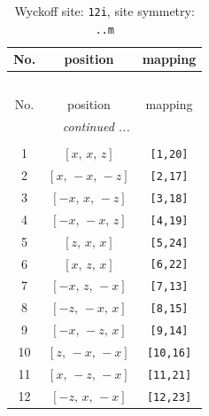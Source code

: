 \documentclass[fleqn,8pt]{jsarticle}
\begin{document}
\begin{longtable}{ccc}
\caption{Wyckoff site: {\tt 12i}, site symmetry: {\tt ..m}}
 \\
 \hline \hline
No. & position & mapping \\ \hline \endfirsthead

\multicolumn{2}{l}{\tablename\ \thetable{}} \\
 \hline \hline
No. & position & mapping \\ \hline \endhead

 \hline \hline
\multicolumn{2}{r}{\footnotesize\it continued ...} \\ \endfoot

 \hline \hline
\multicolumn{2}{r}{} \\ \endlastfoot

1 & $\left[ x,\, x,\, z \right]$ & {\tt [1,20]} \\ \hline
2 & $\left[ x,\, - x,\, - z \right]$ & {\tt [2,17]} \\ \hline
3 & $\left[ - x,\, x,\, - z \right]$ & {\tt [3,18]} \\ \hline
4 & $\left[ - x,\, - x,\, z \right]$ & {\tt [4,19]} \\ \hline
5 & $\left[ z,\, x,\, x \right]$ & {\tt [5,24]} \\ \hline
6 & $\left[ x,\, z,\, x \right]$ & {\tt [6,22]} \\ \hline
7 & $\left[ - x,\, z,\, - x \right]$ & {\tt [7,13]} \\ \hline
8 & $\left[ - z,\, - x,\, x \right]$ & {\tt [8,15]} \\ \hline
9 & $\left[ - x,\, - z,\, x \right]$ & {\tt [9,14]} \\ \hline
10 & $\left[ z,\, - x,\, - x \right]$ & {\tt [10,16]} \\ \hline
11 & $\left[ x,\, - z,\, - x \right]$ & {\tt [11,21]} \\ \hline
12 & $\left[ - z,\, x,\, - x \right]$ & {\tt [12,23]} \\
\end{longtable}
\renewcommand{\arraystretch}{1.2}
\end{document}

